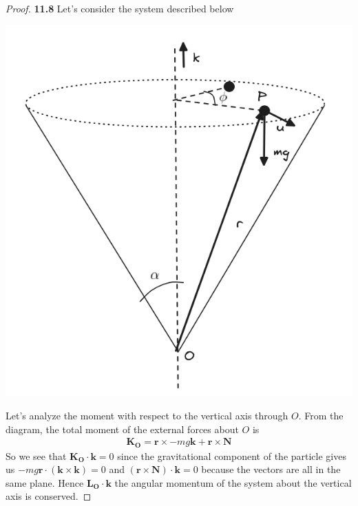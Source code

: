 \documentclass[11pt]{article}
\theoremstyle{definition}
\begin{document}
\begin{proof}{\textbf{11.8}}
    Let's consider the system described below
    \begin{center}
        \includegraphics[scale=0.40]{ch11-8.png}
    \end{center}
    Let's analyze the moment with respect to the vertical axis through $O$.
    From the diagram, the total moment of the external forces about $O$ is
    \begin{align*}
        \bm{K_O} = \bm{r} \times -mg\bm{k} + \bm{r} \times \bm{N}
    \end{align*}
    So we see that $\bm{K_O} \cdot \bm{k} = 0$ since the gravitational
    component of the particle gives us
    $-mg\bm{r} \cdot (\bm{k} \times \bm{k}) = 0$ and
    $(\bm{r} \times \bm{N}) \cdot \bm{k} = 0$ because the vectors are all in
    the same plane.
    Hence $\bm{L_O} \cdot \bm{k}$ the angular momentum of the system about
    the vertical axis is conserved.
    

\end{proof}
\end{document}
